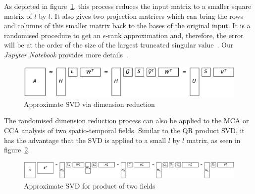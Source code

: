 \documentclass[sigconf]{acmart}
\begin{document}
As depicted in figure~\ref{fig:reduceSizeRandomisedSquare}, this process reduces the input matrix to a smaller square matrix of $l$ by $l$. It also gives two projection matrices which can bring the rows and columns of this smaller matrix back to the bases of the original input. It is a randomised procedure to get an $\epsilon$-rank approximation and, therefore, the error will be at the order of the size of the largest truncated singular value~\cite{Martinsson2016, Halko2011}. Our \textit{Jupyter Notebook} provides more details~\cite{Bogaardt2018}.

\begin{figure}[h]
\begin{center}
\includegraphics[width=\columnwidth]{Results/reduceSizeRandomisedSquare.pdf}
\caption[Approximate randomised SVD]{Approximate SVD via dimension reduction}
\label{fig:reduceSizeRandomisedSquare}
\end{center}
\end{figure}

The randomised dimension reduction process can also be applied to the MCA or CCA analysis of two spatio-temporal fields. Similar to the QR product SVD, it has the advantage that the SVD is applied to a small $l$ by $l$ matrix, as seen in figure~\ref{fig:randomisedSquareProductSVD}.

\begin{figure}[h]
\begin{center}
\includegraphics[width=\columnwidth]{Results/randomisedSquareProductSVD.pdf}
\caption[Approximate product SVD]{Approximate SVD for product of two fields}
\label{fig:randomisedSquareProductSVD}
\end{center}
\end{figure}
\end{document}
